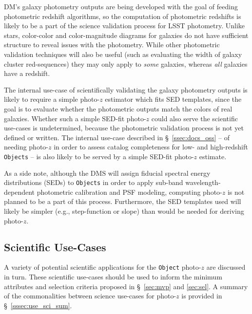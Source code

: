 \documentclass[DM,lsstdraft,toc]{lsstdoc}
\begin{document}
DM's galaxy photometry outputs are being developed with the goal of feeding photometric redshift algorithms, so the computation of photometric redshifts is likely to be a part of the science validation process for LSST photometry. 
Unlike stars, color-color and color-magnitude diagrams for galaxies do not have sufficient structure to reveal issues with the photometry.
While other photometric validation techniques will also be useful (such as evaluating the width of galaxy cluster red-sequences) they may only apply to {\it some} galaxies, whereas {\it all} galaxies have a redshift. 

The internal use-case of scientifically validating the galaxy photometry outputs is likely to require a simple photo-$z$ estimator which fits SED templates, since the goal is to evaluate whether the photometric outputs match the colors of real galaxies.
Whether such a simple SED-fit photo-$z$ could also serve the scientific use-cases is undetermined, because the photometric validation process is not yet defined or written.
The internal use-case described in \S~\ref{ssec:docs_oss} -- of needing photo-$z$ in order to assess catalog completeness for low- and high-redshift {\tt Objects} -- is also likely to be served by a simple SED-fit photo-$z$ estimate.

As a side note, although the DMS will assign fiducial spectral energy distributions (SEDs) to {\tt Objects} in order to apply sub-band wavelength-dependent photometric calibration and PSF modeling, computing photo-$z$ is not planned to be a part of this process.
Furthermore, the SED templates used will likely be simpler (e.g., step-function or slope) than would be needed for deriving photo-$z$.

\subsection{Scientific Use-Cases}\label{ssec:use_sci}

A variety of potential scientific applications for the {\tt Object} photo-$z$ are discussed in turn. 
These scientific use-cases should be used to inform the minimum attributes and selection criteria proposed in \S~\ref{sec:mvp} and \ref{sec:sel}.
A summary of the commonalities between science use-cases for photo-$z$ is provided in \S~\ref{sssec:use_sci_sum}.
\end{document}
